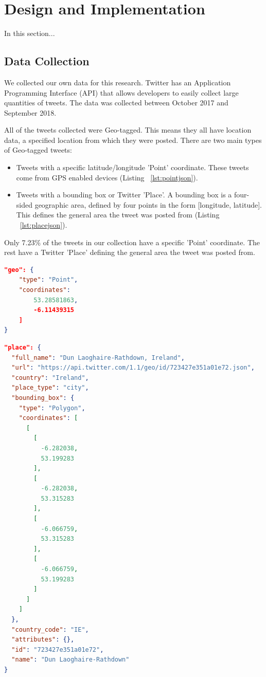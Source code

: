 \chapter{Design and Implementation}

In this section...

\section{Data Collection}
We collected our own data for this research. Twitter has an Application Programming Interface (API) that allows developers to easily collect large quantities of tweets. The data was collected between October 2017 and September 2018.

All of the tweets collected were Geo-tagged. This means they all have location data, a specified location from which they were posted. There are two main types of Geo-tagged tweets:
\begin{itemize}
    \item Tweets with a specific latitude/longitude 'Point' coordinate. These tweets come from GPS enabled devices (Listing ~\ref{lst:pointjson}).
    \item Tweets with a bounding box or Twitter 'Place'. A bounding box is a four-sided geographic area, defined by four points in the form [longitude, latitude]. This defines the general area the tweet was posted from (Listing ~\ref{lst:placejson}).
\end{itemize}

Only 7.23\% of the tweets in our collection have a specific 'Point' coordinate. The rest have a Twitter 'Place' defining the general area the tweet was posted from.
\newline
\begin{lstlisting}[caption={Geo-tagged Tweet with Point Coordinate},captionpos=b,label=lst:pointjson,language=json,firstnumber=1]
"geo": {
    "type": "Point",
    "coordinates": 
        53.28581863,
        -6.11439315
    ]
}
\end{lstlisting}

\begin{lstlisting}[caption={Geo-tagged Tweet with Twitter Place},captionpos=b,label=lst:placejson,language=json,firstnumber=1]
"place": {
  "full_name": "Dun Laoghaire-Rathdown, Ireland",
  "url": "https://api.twitter.com/1.1/geo/id/723427e351a01e72.json",
  "country": "Ireland",
  "place_type": "city",
  "bounding_box": {
    "type": "Polygon",
    "coordinates": [
      [
        [
          -6.282038,
          53.199283
        ],
        [
          -6.282038,
          53.315283
        ],
        [
          -6.066759,
          53.315283
        ],
        [
          -6.066759,
          53.199283
        ]
      ]
    ]
  },
  "country_code": "IE",
  "attributes": {},
  "id": "723427e351a01e72",
  "name": "Dun Laoghaire-Rathdown"
}
\end{lstlisting}

